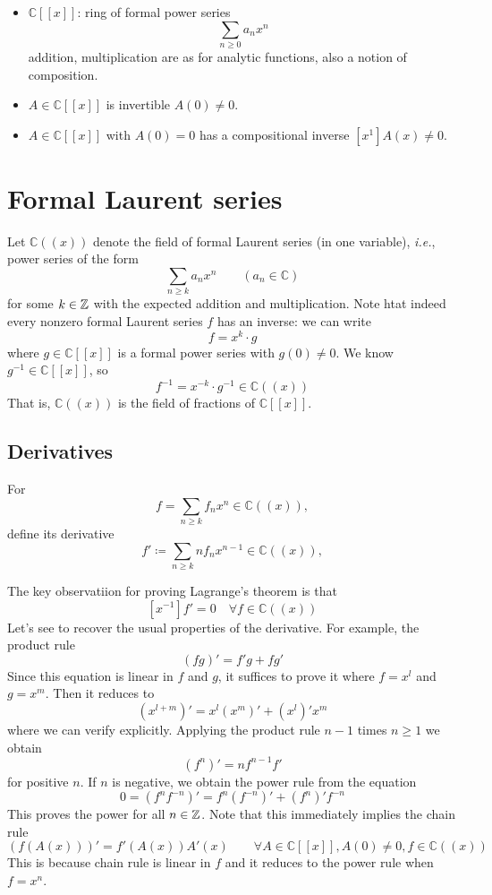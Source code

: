 \begin{itemize}
    \item \(\mathbb{C}[[x]]\): ring of formal power series
    \[ \sum_{n\geq0}a_n x^n \]
    addition, multiplication are as for analytic functions, also a notion of composition.
    \item \(A\in\mathbb{C}[[x]]\) is invertible \iff \(A(0)\neq0\).
    \item \(A\in\mathbb{C}[[x]]\) with \(A(0)=0\) has a compositional inverse \iff \(\left[x^1\right]A(x)\neq0\).
\end{itemize}

\section{Formal Laurent series}
\begin{definition}
Let \(\mathbb{C}((x))\) denote the field of formal Laurent series (in one variable), \textit{i.e.}, power series of the form
\[ \sum_{n\geq k}a_n x^n \qquad (a_n\in\mathbb{C}) \]
for some \(k\in\mathbb{Z}\) with the expected addition and multiplication.
Note htat indeed every nonzero formal Laurent series \(f\) has an inverse:
we can write
\[ f= x^k\cdot g \]
where \(g\in\mathbb{C}[[x]]\) is a formal power series with \(g(0)\neq0\).
We know \(g^{-1}\in\mathbb{C}[[x]]\), so
\[ f^{-1}=x^{-k}\cdot g^{-1}\in\mathbb{C}((x)) \]
That is, \(\mathbb{C}((x))\) is the field of fractions of \(\mathbb{C}[[x]]\).
\end{definition}

\subsection{Derivatives}
\begin{definition}[derivative]
For
\[ f=\sum_{n\geq k}f_n x^n\in\mathbb{C}((x)), \]
define its derivative
\[ f'\coloneqq\sum_{n\geq k}nf_n x^{n-1}\in\mathbb{C}((x)), \]
\end{definition}
The key observatiion for proving Lagrange's theorem is that
\[ \left[x^{-1}\right]f'=0 \quad \forall f\in\mathbb{C}((x)) \]
Let's see to recover the usual properties of the derivative.
For example, the product rule
\[ (fg)'=f'g+fg' \]
Since this equation is linear in \(f\) and \(g\), it suffices to prove it where \(f=x^l\) and \(g=x^m\).
Then it reduces to
\[ \left(x^{l+m}\right)'=x^l\left(x^m\right)'+\left(x^l\right)'x^m \]
where we can verify explicitly.
Applying the product rule \(n-1\) times \(n\geq1\) we obtain
\[ \left(f^n\right)'=nf^{n-1}f' \]
for positive \(n\).
If \(n\) is negative, we obtain the power rule from the equation
\[ 0=\left(f^n f^{-n}\right)'=f^n\left(f^{-n}\right)'+\left(f^n\right)'f^{-n} \]
This proves the power for all \(n\in\mathbb{Z}\).
Note that this immediately implies the chain rule
\[ \left(f(A(x))\right)'=f'(A(x))A'(x) \qquad \forall A\in\mathbb{C}[[x]],A(0)\neq0,f\in\mathbb{C}((x)) \]
This is because chain rule is linear in \(f\) and it reduces to the power rule when \(f=x^n\).

